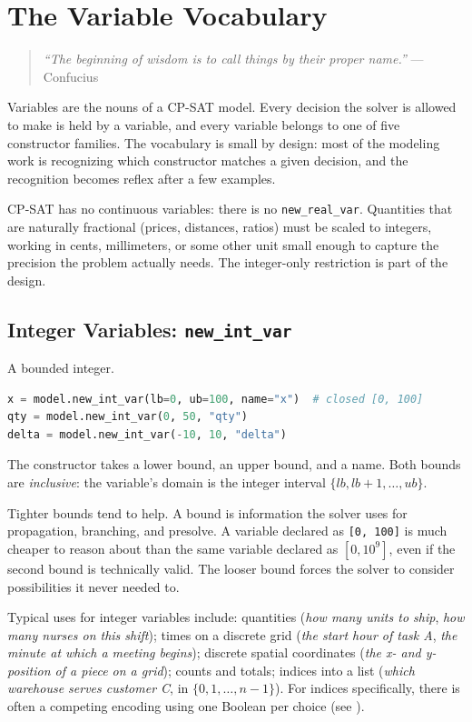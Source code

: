 \chapter{The Variable Vocabulary}\label{chap:6}

\begin{quote}
\emph{``The beginning of wisdom is to call things by their proper
name.''} --- Confucius
\end{quote}

Variables are the nouns of a CP-SAT model. Every decision the solver is
allowed to make is held by a variable, and every variable belongs to one
of five constructor families. The vocabulary is small by design: most of
the modeling work is recognizing which constructor matches a given
decision, and the recognition becomes reflex after a few examples.

CP-SAT has no continuous variables: there is no
\lstinline!new_real_var!. Quantities that are naturally
fractional (prices, distances, ratios) must be scaled to integers,
working in cents, millimeters, or some other unit small enough to
capture the precision the problem actually needs. The integer-only
restriction is part of the design.

\section{\texorpdfstring{Integer Variables: \texttt{new\_int\_var}}{Integer Variables: new\_int\_var}}\label{sec:6.1}

A bounded integer.

\begin{lstlisting}[language=Python]
x = model.new_int_var(lb=0, ub=100, name="x")  # closed [0, 100]
qty = model.new_int_var(0, 50, "qty")
delta = model.new_int_var(-10, 10, "delta")
\end{lstlisting}

The constructor takes a lower bound, an upper bound, and a name. Both
bounds are \emph{inclusive}: the variable's domain is the integer
interval \(\{lb, lb+1, \dots, ub\}\).

Tighter bounds tend to help. A bound is information the solver uses for
propagation, branching, and presolve. A variable declared as
\lstinline![0, 100]! is much cheaper to reason about than
the same variable declared as \([0, 10^9]\), even if the second bound is
technically valid. The looser bound forces the solver to consider
possibilities it never needed to.

Typical uses for integer variables include: quantities (\emph{how many
units to ship}, \emph{how many nurses on this shift}); times on a
discrete grid (\emph{the start hour of task A}, \emph{the minute at
which a meeting begins}); discrete spatial coordinates (\emph{the x- and
y-position of a piece on a grid}); counts and totals; indices into a
list (\emph{which warehouse serves customer C}, in
\(\{0, 1, \dots, n-1\}\)). For indices specifically, there is often a
competing encoding using one Boolean per choice (see ).

